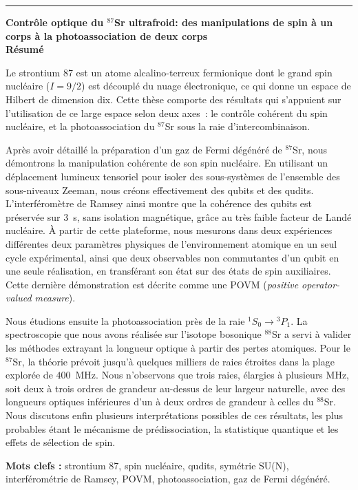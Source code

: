 \vspace{0.1cm}
\noindent\rule{\textwidth}{0.4pt}
\vspace{0.3cm}

\begin{center}
    {\large \textbf{Contrôle optique du $^{87}$Sr ultrafroid: des manipulations de spin à un corps à la photoassociation de deux corps}}\\[0.4cm]
    {\large \textbf{Résumé}}\\[-0.3cm]
\end{center}

{\footnotesize
Le strontium 87 est un atome alcalino-terreux fermionique dont le grand spin nucléaire
($I=9/2$) est découplé du nuage électronique, ce qui donne un espace de Hilbert de dimension
dix. Cette thèse comporte des résultats qui s'appuient sur l'utilisation de ce large espace
selon deux axes~: le contrôle cohérent du spin nucléaire, et la photoassociation du $^{87}$Sr
sous la raie d'intercombinaison.

Après avoir détaillé la préparation d'un gaz de Fermi dégénéré de $^{87}$Sr, nous démontrons
la manipulation cohérente de son spin nucléaire. En utilisant un déplacement lumineux
tensoriel pour isoler des sous-systèmes de l'ensemble des sous-niveaux Zeeman, nous créons
effectivement des qubits et des qudits. L'interféromètre de Ramsey ainsi montre que
la cohérence des qubits est préservée sur $3$~s, sans isolation magnétique, grâce au très
faible facteur de Landé nucléaire. À partir de cette plateforme, nous mesurons dans deux
expériences différentes deux paramètres physiques de l'environnement atomique en un seul
cycle expérimental, ainsi que deux observables non commutantes d'un qubit en une seule
réalisation, en transférant son état sur des états de spin auxiliaires. Cette dernière
démonstration est décrite comme une POVM (\textit{positive operator-valued measure}).

Nous étudions ensuite la photoassociation près de la raie $^1S_0\rightarrow{}^3P_1$. La
spectroscopie que nous avons réalisée sur l'isotope bosonique $^{88}$Sr a servi à valider
les méthodes extrayant la longueur optique à partir des pertes atomiques. Pour le $^{87}$Sr,
la théorie prévoit jusqu'à quelques milliers de raies étroites dans la plage explorée de
$400$~MHz. Nous n'observons que trois raies, élargies à plusieurs MHz, soit deux à trois
ordres de grandeur au-dessus de leur largeur naturelle, avec des longueurs optiques
inférieures d'un à deux ordres de grandeur à celles du $^{88}$Sr. Nous discutons enfin
plusieurs interprétations possibles de ces résultats, les plus probables étant le mécanisme
de prédissociation, la statistique quantique et les effets de sélection de spin.

\vspace{0.15cm}
\noindent\textbf{Mots clefs :} strontium 87, spin nucléaire, qudits, symétrie SU(N), interférométrie de Ramsey, POVM, photoassociation, gaz de Fermi dégénéré.
\par}
